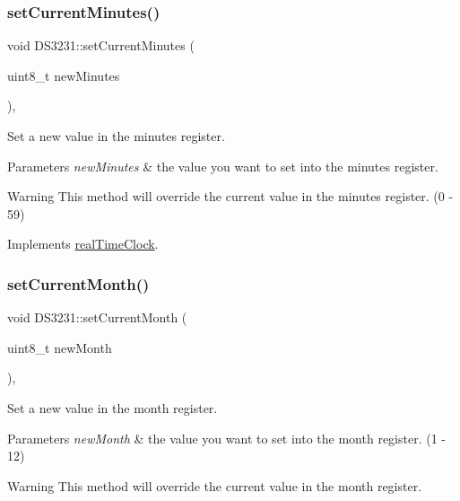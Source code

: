 \subsubsection{\texorpdfstring{set\+Current\+Minutes()}{setCurrentMinutes()}}
{\footnotesize\ttfamily void D\+S3231\+::set\+Current\+Minutes (\begin{DoxyParamCaption}\item[{uint8\+\_\+t}]{new\+Minutes }\end{DoxyParamCaption})\hspace{0.3cm}{\ttfamily [override]}, {\ttfamily [virtual]}}



Set a new value in the minutes register. 


\begin{DoxyParams}{Parameters}
{\em new\+Minutes} & the value you want to set into the minutes register. \\
\hline
\end{DoxyParams}
\begin{DoxyWarning}{Warning}
This method will override the current value in the minutes register. (0 -\/ 59) 
\end{DoxyWarning}


Implements \mbox{\hyperlink{classreal_time_clock_a52da7366cd5f1e4c270eb87e7298da42}{real\+Time\+Clock}}.

\mbox{\label{class_d_s3231_a122611bf693cdd538178b99b893a7115}} 
\subsubsection{\texorpdfstring{set\+Current\+Month()}{setCurrentMonth()}}
{\footnotesize\ttfamily void D\+S3231\+::set\+Current\+Month (\begin{DoxyParamCaption}\item[{uint8\+\_\+t}]{new\+Month }\end{DoxyParamCaption})\hspace{0.3cm}{\ttfamily [override]}, {\ttfamily [virtual]}}



Set a new value in the month register. 


\begin{DoxyParams}{Parameters}
{\em new\+Month} & the value you want to set into the month register. (1 -\/ 12) \\
\hline
\end{DoxyParams}
\begin{DoxyWarning}{Warning}
This method will override the current value in the month register. 
\end{DoxyWarning}


